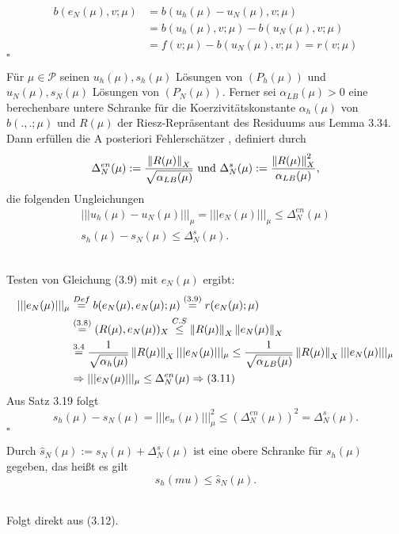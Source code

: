 \\
\begin{align*}
b(e_N(\mu),v;\mu) &= b(u_h(\mu)-u_N(\mu),v;\mu)\\
&= b(u_h(\mu),v;\mu) - b(u_N(\mu),v;\mu)\\
&= f(v;\mu) - b(u_N(\mu),v;\mu) = r(v;\mu)
\end{align*}
\hfill $\square$

Für $\mu\in\mathcal{P}$ seinen $u_h(\mu),s_h(\mu)$ Lösungen von $(P_h(\mu))$ und $u_N(\mu),s_N(\mu)$ Lösungen von $(P_N(\mu))$.
Ferner sei $\alpha_{LB}(\mu) > 0$ eine berechenbare untere Schranke für die Koerzivitätskonstante $\alpha_h(\mu)$ von $b(.,.;\mu)$ und $R(\mu)$ der Riesz-Repräsentant des Residuums aus Lemma 3.34.
Dann erfüllen die A posteriori Fehlerschätzer , definiert durch 
\begin{align}
\Delta_N^{en}(\mu) := \frac{\left\Vert R(\mu)\right\Vert_X}{\sqrt{\alpha_{LB}(\mu)}} \text{ und } \Delta_N^s(\mu) := \frac{\left\Vert R(\mu)\right\Vert_X^2}{\alpha_{LB}(\mu)},
\end{align}
die folgenden Ungleichungen
\begin{align}
|||u_h(\mu)-u_N(\mu)|||_\mu = |||e_N(\mu)|||_\mu \le \Delta_N^{en}(\mu)\\
s_h(\mu)-s_N(\mu) \le \Delta_N^s(\mu).
\end{align}

\\
Testen von Gleichung (3.9) mit $e_N(\mu)$ ergibt:
\begin{align*}
|||e_N(\mu)|||_\mu &\stackrel{Def}{=} b(e_N(\mu),e_N(\mu);\mu) \stackrel{(3.9)}{=} r(e_N(\mu);\mu)\\
&\stackrel{(3.8)}{=} (R(\mu),e_N(\mu))_X \stackrel{C.S}{\le} \left\Vert R(\mu)\right\Vert_X\left\Vert e_N(\mu)\right\Vert_X\\
&\stackrel{3.4}{=} \frac{1}{\sqrt{\alpha_h(\mu)}} \left\Vert R(\mu)\right\Vert_X |||e_N(\mu)|||_\mu \le \frac{1}{\sqrt{\alpha_{LB}(\mu)}} \left\Vert R(\mu)\right\Vert_X |||e_N(\mu)|||_\mu\\
&\Rightarrow |||e_N(\mu)|||_\mu \le \Delta_N^{en}(\mu) \Rightarrow (3.11)
\end{align*}
Aus Satz 3.19 folgt
\[
s_h(\mu) -s_N(\mu) = |||e_n(\mu)|||_\mu^2 \le (\Delta_N^{en}(\mu))^2 = \Delta_N^s(\mu).
\]
\hfill $\square$

Durch $\hat{s}_N(\mu) := s_N(\mu) + \Delta_N^s(\mu)$ ist eine obere Schranke für $s_h(\mu)$ gegeben, das heißt es gilt
\[
s_h(mu) \le \hat{s}_N(\mu).
\]

\\
Folgt direkt aus (3.12).


